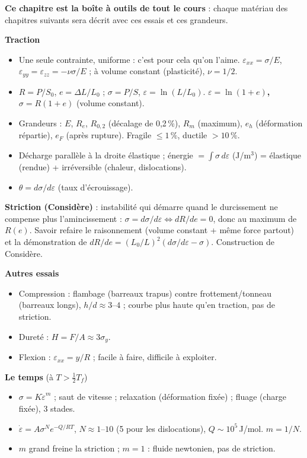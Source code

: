 \begin{recapbox}
\textbf{Ce chapitre est la boîte à outils de tout le cours} : chaque matériau des chapitres
suivants sera décrit avec ces essais et ces grandeurs.

\textbf{Traction}
\begin{itemize}
  \item Une seule contrainte, uniforme : c'est pour cela qu'on l'aime.
        $\varepsilon_{xx} = \sigma/E$, $\varepsilon_{yy} = \varepsilon_{zz} = -\nu\sigma/E$ ;
        à volume constant (plasticité), $\nu = 1/2$.
  \item $R = P/S_0$, $e = \Delta L/L_0$ ; $\sigma = P/S$, $\varepsilon = \ln(L/L_0)$.
        \textbf{$\varepsilon = \ln(1+e)$, $\sigma = R(1+e)$} (volume constant).
  \item Grandeurs : $E$, $R_e$, $R_{0,2}$ (décalage de 0,2\,\%), $R_m$ (maximum), $e_h$
        (déformation répartie), $e_F$ (après rupture). Fragile $\le 1\,\%$, ductile $> 10\,\%$.
  \item Décharge parallèle à la droite élastique ; énergie $= \int\sigma\,d\varepsilon$
        (J/m$^3$) = élastique (rendue) + irréversible (chaleur, dislocations).
  \item $\theta = d\sigma/d\varepsilon$ (taux d'écrouissage).
\end{itemize}

\textbf{Striction (Considère)} : instabilité qui démarre quand le durcissement ne compense plus
l'amincissement : \textbf{$\sigma = d\sigma/d\varepsilon \Leftrightarrow dR/de = 0$}, donc au
maximum de $R(e)$. Savoir refaire le raisonnement (volume constant + même force partout) et la
démonstration de $dR/de = (L_0/L)^2(d\sigma/d\varepsilon - \sigma)$. Construction de Considère.

\textbf{Autres essais}
\begin{itemize}
  \item Compression : flambage (barreaux trapus) contre frottement/tonneau (barreaux longs),
        $h/d \approx 3$--$4$ ; courbe plus haute qu'en traction, pas de striction.
  \item Dureté : $H = F/A \approx 3\sigma_y$.
  \item Flexion : $\varepsilon_{xx} = y/R$ ; facile à faire, difficile à exploiter.
\end{itemize}

\textbf{Le temps} (à $T > \frac12 T_f$)
\begin{itemize}
  \item $\sigma = K\dot\varepsilon^m$ ; saut de vitesse ; relaxation (déformation fixée) ;
        fluage (charge fixée), 3 stades.
  \item \textbf{$\dot\varepsilon = A\sigma^N e^{-Q/RT}$}, $N \approx 1$--$10$ (5 pour les
        dislocations), $Q \sim 10^5$\,J/mol. $m = 1/N$.
  \item $m$ grand freine la striction ; $m = 1$ : fluide newtonien, pas de striction.
\end{itemize}


\end{recapbox}
